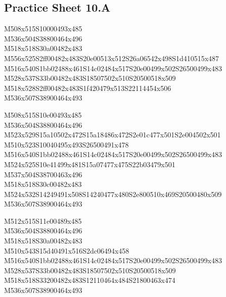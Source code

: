 \documentclass{article}
\begin{document}
\subsection{Practice Sheet 10.A}

\begin{multicols}{5}
\begin{center}

M508x515S10000493x485 %
\\M536x504S38800464x496 %
\\M518x518S30a00482x483 %
\\M556x525S2ff00482x483S20e00513x512S26a06542x498S1d410515x487 %
\\M516x540S1bb02488x461S14c02484x517S20e00499x502S26500499x483 %
\\M528x537S33b00482x483S18507502x510S20500518x509 %
\\M518x528S2ff00482x483S1f420479x513S22114454x506 %
\\M536x507S38900464x493 %
\vfil
\columnbreak

M508x515S10e00493x485 %
\\M536x504S38800464x496 %
\\M523x529S15a10502x472S15a18486x472S2e01c477x501S2e004502x501 %
\\M510x523S10040495x493S26500491x478 %
\\M516x540S1bb02488x461S14c02484x517S20e00499x502S26500499x483 %
\\M524x525S10e41499x481S15a07477x475S22b03479x501 %
\\M537x504S38700463x496 %
\\M518x518S30c00482x483 %
\\M524x532S14249491x508S14240477x480S2e800510x469S20500480x509 %
\\M536x507S38900464x493 %
\vfil
\columnbreak

M512x515S11e00489x485 %
\\M536x504S38800464x496 %
\\M518x518S30a00482x483 %
\\M510x543S15d40491x516S2dc06494x458 %
\\M516x540S1bb02488x461S14c02484x517S20e00499x502S26500499x483 %
\\M528x537S33b00482x483S18507502x510S20500518x509 %
\\M518x518S33200482x483S12110464x484S21800463x474 %
\\M536x507S38900464x493 %
\vfil
\columnbreak


\end{center}
\end{multicols}
\end{document}
